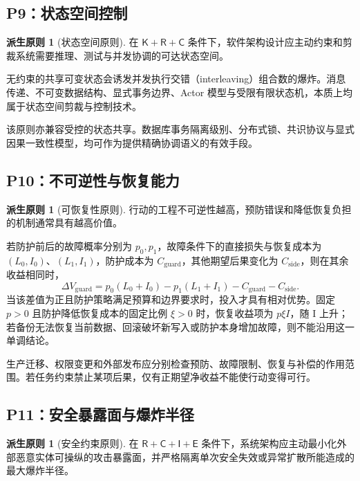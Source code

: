 \documentclass[11pt,a4paper]{ctexart}
\numberwithin{equation}{section}
\theoremstyle{definition}
\newtheorem{principle}[definition]{派生原则}
\theoremstyle{plain}
\newcommand{\Know}{\mathsf{K}}
\newcommand{\Res}{\mathsf{R}}
\newcommand{\Ctrl}{\mathsf{C}}
\newcommand{\Info}{\mathsf{I}}
\newcommand{\Eth}{\mathsf{E}}
\begin{document}
\subsection{P9：状态空间控制}

\begin{principle}[状态空间原则]
在 $\Know+\Res+\Ctrl$ 条件下，软件架构设计应主动约束和剪裁系统需要推理、测试与并发协调的可达状态空间。
\end{principle}

无约束的共享可变状态会诱发并发执行交错（interleaving）组合数的爆炸。消息传递、不可变数据结构、显式事务边界、Actor 模型与受限有限状态机，本质上均属于状态空间剪裁与控制技术。

该原则亦兼容受控的状态共享。数据库事务隔离级别、分布式锁、共识协议与显式因果一致性模型，均可作为提供精确协调语义的有效手段。

\subsection{P10：不可逆性与恢复能力}

\begin{principle}[可恢复性原则]
行动的工程不可逆性越高，预防错误和降低恢复负担的机制通常具有越高价值。
\end{principle}

若防护前后的故障概率分别为 $p_0,p_1$，故障条件下的直接损失与恢复成本为 $(L_0,I_0)$、$(L_1,I_1)$，防护成本为 $C_{\mathrm{guard}}$，其他期望后果变化为 $C_{\mathrm{side}}$，则在其余收益相同时，
\[
\Delta V_{\mathrm{guard}}
=p_0(L_0+I_0)-p_1(L_1+I_1)
-C_{\mathrm{guard}}-C_{\mathrm{side}}.
\]
当该差值为正且防护策略满足预算和边界要求时，投入才具有相对优势。固定 $p>0$ 且防护降低恢复成本的固定比例 $\xi>0$ 时，恢复收益项为 $p\xi I$，随 I 上升；若备份无法恢复当前数据、回滚破坏新写入或防护本身增加故障，则不能沿用这一单调结论。

生产迁移、权限变更和外部发布应分别检查预防、故障限制、恢复与补偿的作用范围。若任务约束禁止某项后果，仅有正期望净收益不能使行动变得可行。

\subsection{P11：安全暴露面与爆炸半径}

\begin{principle}[安全约束原则]
在 $\Res+\Ctrl+\Info+\Eth$ 条件下，系统架构应主动最小化外部恶意实体可操纵的攻击暴露面，并严格隔离单次安全失效或异常扩散所能造成的最大爆炸半径。
\end{principle}
\end{document}
